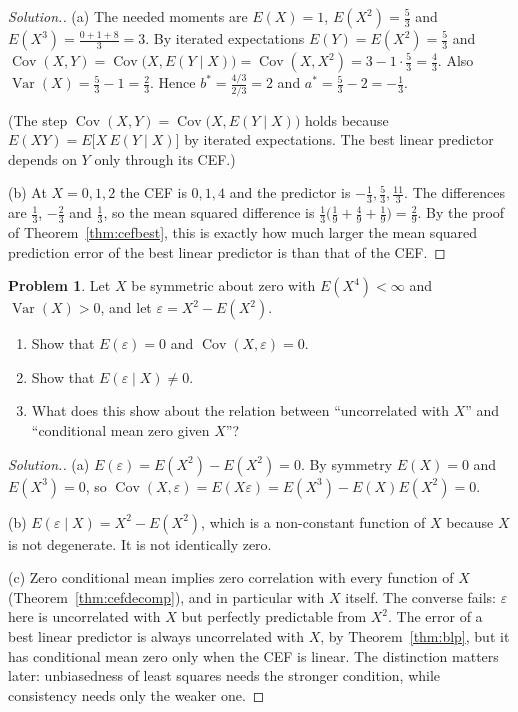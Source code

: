 \documentclass[11pt,a4paper]{article}
\numberwithin{equation}{section}
\DeclareMathOperator{\Var}{Var}
\DeclareMathOperator{\Cov}{Cov}
\theoremstyle{definition}
\newtheorem{problemx}{Problem}[subsection]
\newenvironment{problem}{\begin{problemx}}{\end{problemx}}
\newenvironment{solution}
  {\renewcommand{\qedsymbol}{}\begin{proof}[\textit{Solution}.]}
  {\end{proof}}
\begin{document}
\begin{solution}
(a) The needed moments are $E(X) = 1$, $E(X^2) = \frac53$ and $E(X^3) = \frac{0 + 1 + 8}{3} = 3$. By iterated expectations
$E(Y) = E(X^2) = \frac53$ and $\Cov(X, Y) = \Cov\bigl(X, E(Y \mid X)\bigr) = \Cov(X, X^2) = 3 - 1\cdot\frac53 = \frac43$. Also $\Var(X) = \frac53 - 1 = \frac23$.
Hence $b^* = \frac{4/3}{2/3} = 2$ and $a^* = \frac53 - 2 = -\frac13$.

(The step $\Cov(X, Y) = \Cov\bigl(X, E(Y \mid X)\bigr)$ holds because $E(XY) = E\bigl[X\,E(Y \mid X)\bigr]$ by iterated expectations. The best linear
predictor depends on $Y$ only through its CEF.)

(b) At $X = 0, 1, 2$ the CEF is $0, 1, 4$ and the predictor is $-\frac13, \frac53, \frac{11}{3}$. The differences are $\frac13$, $-\frac23$ and $\frac13$, so
the mean squared difference is $\frac13\bigl(\frac19 + \frac49 + \frac19\bigr) = \frac29$. By the proof of Theorem~\ref{thm:cefbest}, this is exactly how much larger
the mean squared prediction error of the best linear predictor is than that of the CEF.
\end{solution}

\begin{problem}
\label{prob:uncorr}
Let $X$ be symmetric about zero with $E(X^4) < \infty$ and $\Var(X) > 0$, and let $\varepsilon = X^2 - E(X^2)$.
\begin{enumerate}[label=(\alph*)]
\item Show that $E(\varepsilon) = 0$ and $\Cov(X, \varepsilon) = 0$.
\item Show that $E(\varepsilon \mid X) \neq 0$.
\item What does this show about the relation between ``uncorrelated with $X$'' and ``conditional mean zero given $X$''?
\end{enumerate}
\end{problem}

\begin{solution}
(a) $E(\varepsilon) = E(X^2) - E(X^2) = 0$. By symmetry $E(X) = 0$ and $E(X^3) = 0$, so
$\Cov(X, \varepsilon) = E(X\varepsilon) = E(X^3) - E(X)E(X^2) = 0$.

(b) $E(\varepsilon \mid X) = X^2 - E(X^2)$, which is a non-constant function of $X$ because $X$ is not degenerate. It is not identically zero.

(c) Zero conditional mean implies zero correlation with every function of $X$ (Theorem~\ref{thm:cefdecomp}), and in particular with $X$
itself. The converse fails: $\varepsilon$ here is uncorrelated with $X$ but perfectly predictable from $X^2$. The error of a best linear predictor is
always uncorrelated with $X$, by Theorem~\ref{thm:blp}, but it has conditional mean zero only when the CEF is linear. The distinction matters
later: unbiasedness of least squares needs the stronger condition, while consistency needs only the weaker one.
\end{solution}
\end{document}
